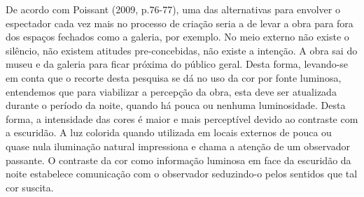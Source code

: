 De acordo com Poissant (2009, p.76-77), uma das alternativas para envolver o espectador cada vez mais no processo de criação seria a de levar a obra para fora dos espaços fechados como a galeria, por exemplo. No meio externo não existe o silêncio, não existem atitudes pre-concebidas, não existe a intenção. A obra sai do museu e da galeria para ficar próxima do público geral. Desta forma, levando-se em conta que o recorte desta pesquisa se dá no uso da cor por fonte luminosa, entendemos que para viabilizar a percepção da obra, esta deve ser atualizada durante o período da noite, quando há pouca ou nenhuma luminosidade. Desta forma, a intensidade das cores é maior e mais perceptível devido ao contraste com a escuridão. A luz colorida quando utilizada em locais externos de pouca ou quase nula iluminação natural impressiona e chama a atenção de um observador passante. O contraste da cor como informação luminosa em face da escuridão da noite estabelece comunicação com o observador seduzindo-o pelos sentidos que tal cor suscita. \cite[p.125]{henno}







